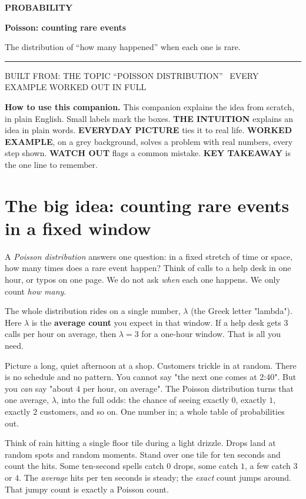 \documentclass[a4paper,11pt]{article}
\newcommand{\SeriesName}{Probability}          %
\newcommand{\titlebanner}[4]{%
  \begingroup\raggedright
  \vspace*{4mm}
  {\sffamily\footnotesize\bfseries\color{accent}\MakeUppercase{#1}}\par
  \vspace{7pt}
  {\sffamily\bfseries\fontsize{30}{35}\selectfont\color{inktext}#2\par}
  \vspace{7pt}
  {\large\color{mutedtext}#3\par}
  \vspace{12pt}
  {\color{hairline}\rule{\linewidth}{0.5pt}}\par
  \vspace{3pt}
  {\sffamily\scriptsize\color{mutedtext}\MakeUppercase{#4}}\par
  \vspace{10pt}
  \endgroup
}
\newenvironment{intuitionbox}{\begin{intuition}}{\end{intuition}}
\newenvironment{everydaybox}{\begin{everyday}}{\end{everyday}}
\begin{document}
\thispagestyle{fancy}
\titlebanner
  {\SeriesName}
  {Poisson: counting rare events}
  {The distribution of ``how many happened'' when each one is rare.}
  {Built from: the topic ``Poisson distribution'' \textperiodcentered\ Every example worked out in full}

\noindent\textbf{How to use this companion.}
This companion explains the idea from scratch, in plain English. Small labels
mark the boxes. \textsf{\small\textbf{THE INTUITION}} explains an idea in plain
words. \textsf{\small\textbf{EVERYDAY PICTURE}} ties it to real life.
\textsf{\small\textbf{WORKED EXAMPLE}}, on a grey background, solves a problem
with real numbers, every step shown. \textsf{\small\textbf{WATCH OUT}} flags a
common mistake. \textsf{\small\textbf{KEY TAKEAWAY}} is the one line to remember.

\section{The big idea: counting rare events in a fixed window}

A \emph{Poisson distribution} answers one question: in a fixed stretch of time
or space, how many times does a rare event happen? Think of calls to a help
desk in one hour, or typos on one page. We do not ask \emph{when} each one
happens. We only count \emph{how many}.

The whole distribution rides on a single number, $\lambda$ (the Greek letter
"lambda"). Here $\lambda$ is the \textbf{average count} you expect in that
window. If a help desk gets $3$ calls per hour on average, then $\lambda = 3$
for a one-hour window. That is all you need.

\begin{intuitionbox}
Picture a long, quiet afternoon at a shop. Customers trickle in at random.
There is no schedule and no pattern. You cannot say "the next one comes at
2:40". But you \emph{can} say "about $4$ per hour, on average". The Poisson
distribution turns that one average, $\lambda$, into the full odds: the chance
of seeing exactly $0$, exactly $1$, exactly $2$ customers, and so on. One
number in; a whole table of probabilities out.
\end{intuitionbox}

\begin{everydaybox}
Think of rain hitting a single floor tile during a light drizzle. Drops land at
random spots and random moments. Stand over one tile for ten seconds and count
the hits. Some ten-second spells catch $0$ drops, some catch $1$, a few catch
$3$ or $4$. The \emph{average} hits per ten seconds is steady; the
\emph{exact} count jumps around. That jumpy count is exactly a Poisson count.
\end{everydaybox}
\end{document}
